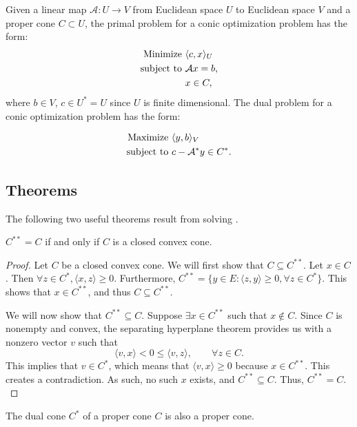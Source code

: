	Given a linear map $\mathcal{A} : U \rightarrow V$ from Euclidean space $U$ to Euclidean space $V$ and a proper cone $C \subset U$, the primal problem for a conic optimization problem has the form:
	\begin{equation} \label{eqconicprimal}
		\begin{split}
			\textnormal{Minimize } & \langle c,x \rangle_U \\
			\textnormal{subject to } & \mathcal{A}x = b, \\
			& x \in C,
		\end{split}
	\end{equation}
	where $b \in V$, $c \in U^* = U$ since $U$ is finite dimensional. The dual problem for a conic optimization problem has the form:
	
	\begin{equation} \label{eqconicdual}
		\begin{split}
			\textnormal{Maximize } & \langle y,b \rangle_V \\
			\textnormal{subject to } & c - \mathcal{A}^*y \in C^*.
		\end{split}
	\end{equation}
		
	\subsection{Theorems}
	
	The following two useful theorems result from solving \cite[p.~21, Exercise 2.24]{BlekhermanGrigoriy;ParriloPabloA.;Thomas2013}.
	
	\begin{theorem}
		$C^{**} = C$ if and only if $C$ is a closed convex cone.
	\end{theorem}
	
	\begin{proof}
		Let $C$ be a closed convex cone. We will first show that $C \subseteq C^{**}$. Let $x \in C$. Then $\forall z \in C^*, \langle x, z\rangle \geq 0$. Furthermore, $C^{**} = \{y \in E : \langle z, y \rangle \geq 0, \forall z \in C^*\}.$ This shows that $x \in C^{**}$, and thus $C \subseteq C^{**}$.
	
		We will now show that $C^{**} \subseteq  C$. Suppose $\exists x \in C^{**}$ such that $x \not\in C$. Since $C$ is nonempty and convex, the separating hyperplane theorem provides us with a nonzero vector $v$ such that 
		$$
		\langle v, x \rangle < 0 \leq \langle v, z \rangle, \qquad \forall z \in C.
		$$
		This implies that $v \in C^*$, which means that $\langle v, x \rangle \geq 0$ because $x \in C^{**}$. This creates a contradiction. As such, no such $x$ exists, and $C^{**} \subseteq C$. Thus, $C^{**} = C.$ 
	\end{proof}	
	\begin{theorem}
		The dual cone $C^*$ of a proper cone $C$ is also a proper cone.
	\end{theorem}
	
